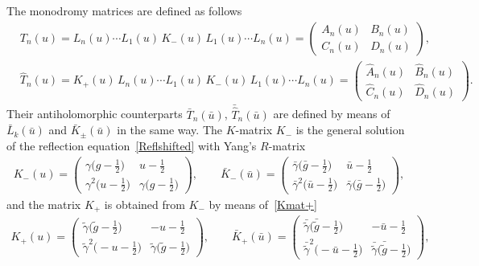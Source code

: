 \documentclass[a4paper,11pt]{article}
\numberwithin{equation}{section}
\begin{document}
The monodromy matrices are defined as follows \cite{Skl:Boundary,KS,PP}
\begin{align}
	& \label{Top}
	T_n(u) = L_n(u) \cdots L_1(u)\,K_-(u)\,L_1(u) \cdots L_n(u) = \begin{pmatrix}
		A_n(u) & B_n(u) \\
		C_n(u) & D_n(u)
	\end{pmatrix} , 
	\\
	& \label{Top1}
	\hat{T}_n(u) = K_+(u)\,L_n(u) \cdots L_1(u)\,K_-(u)\,L_1(u) \cdots L_n(u) = \begin{pmatrix}
		\hat{A}_n(u) & \hat{B}_n(u) \\
		\hat{C}_n(u) & \hat{D}_n(u)
	\end{pmatrix} .
\end{align}
Their antiholomorphic counterparts $\bar{T}_n(\bar{u})$, $\bar{\hat{T}}_n(\bar{u})$ are defined by 
means of $\bar{L}_k(\bar{u})$ and $\bar{K}_\pm(\bar{u})$ in the same way.
The $K$-matrix $K_-$ is the general solution of the reflection equation~\eqref{Reflshifted} with Yang's $R$-matrix~\cite{Skl:Boundary,PP,KulSk}
\begin{align} \label{K-}
	K_-(u) = \begin{pmatrix}
		\gamma\bigl(g - \frac{1}{2} \bigr) & u - \frac{1}{2} \\[6pt]
		\gamma^2 \bigl(u - \frac{1}{2} \bigr) & \gamma\bigl(g - \frac{1}{2} \bigr)
	\end{pmatrix},
	\qquad
	\bar{K}_-(\bar{u}) = \begin{pmatrix}
		\bar{\gamma}\bigl(\bar{g} - \frac{1}{2} \bigr) & \bar{u} - \frac{1}{2} \\[6pt]
		\bar{\gamma}^2 \bigl(\bar{u} - \frac{1}{2} \bigr) & \bar{\gamma}\bigl(\bar{g} - \frac{1}{2} \bigr)
	\end{pmatrix},
\end{align}
and the matrix $K_+$ is obtained from $K_-$ by means of~\eqref{Kmat+}
\begin{align} \label{K+}
	K_+(u) = \begin{pmatrix}
		\tilde{\gamma}\bigl(\tilde{g} - \frac{1}{2} \bigr) & -u - \frac{1}{2} \\[6pt]
		\tilde{\gamma}^2 \bigl(-u - \frac{1}{2} \bigr) & \tilde{\gamma}\bigl(\tilde{g} - \frac{1}{2} \bigr)
	\end{pmatrix},
	\qquad
	\bar{K}_+(\bar{u}) = \begin{pmatrix}
		\bar{\tilde{\gamma}}\bigl(\bar{\tilde{g}} - \frac{1}{2} \bigr) & -\bar{u} - \frac{1}{2} \\[6pt]
		\bar{\tilde{\gamma}}^2 \bigl(-\bar{u} - \frac{1}{2} \bigr) & \bar{\tilde{\gamma}}\bigl(\bar{\tilde{g}} - \frac{1}{2} \bigr)
	\end{pmatrix},
\end{align}
\end{document}
